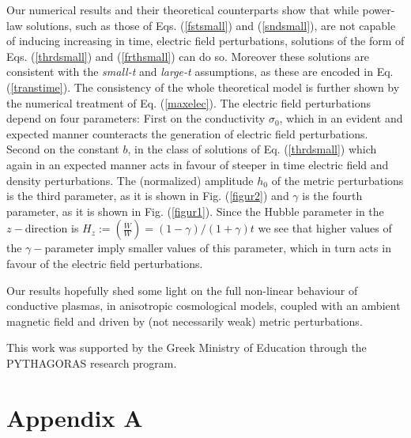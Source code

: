 \documentclass[prd,twocolumn,showpacs,preprintnumbers,amsmath,amssy mb]{revtex4}
\begin{document}
Our numerical results and their 
theoretical counterparts show that while power-law solutions, such as 
those of Eqs. (\ref{fstsmall}) and (\ref{sndsmall}), are not capable 
of inducing increasing in time, electric field perturbations, solutions 
of the form of Eqs. (\ref{thrdsmall}) and (\ref{frthsmall}) can do so. 
Moreover these solutions are consistent with the {\it small-t} and 
{\it large-t} assumptions, as these are encoded in Eq. (\ref{transtime}). 
The consistency of the whole theoretical model is further shown 
by the numerical treatment of Eq. (\ref{maxelec}). The electric 
field perturbations depend on four parameters: First on the conductivity 
$\sigma _{0}$, which in an evident and expected manner counteracts 
the generation of electric field perturbations. Second on the 
constant $b$, in the class of solutions of Eq. (\ref{thrdsmall}) 
which again in an expected manner acts in favour of steeper in 
time electric field and density perturbations. The (normalized) 
amplitude $h_{0}$ of the metric perturbations is the third parameter, 
as it is shown in Fig. (\ref{figur2}) and $\gamma $ is the fourth 
parameter, as it is shown in Fig. (\ref{figur1}). Since the 
Hubble parameter in the $z-$direction is 
$H_{z}:=(\frac{\dot{W}}{W})=(1-\gamma )/(1+\gamma )t$ we see that 
higher values of the $\gamma -$parameter imply smaller values 
of this parameter, which in turn acts in favour of the electric 
field perturbations. 

Our results hopefully shed some light on the full non-linear 
behaviour of conductive plasmas, in anisotropic cosmological 
models, coupled with an ambient magnetic field and driven by 
(not necessarily weak) metric perturbations. 


\begin{acknowledgments}
This work was supported by the Greek Ministry of Education through the
PYTHAGORAS research program.
\end{acknowledgments}
\section*{Appendix A }
\end{document}
